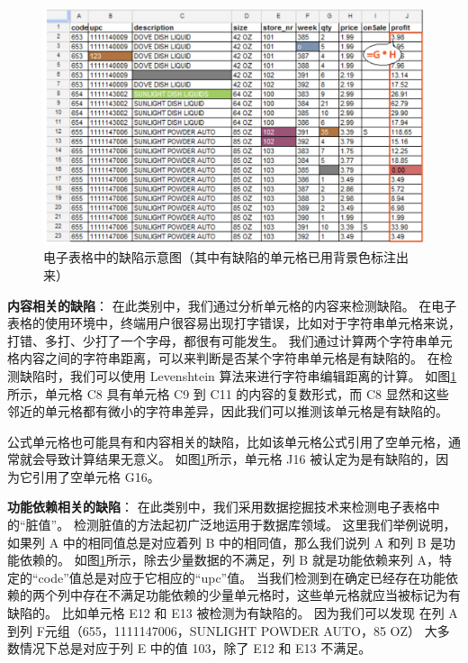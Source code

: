\begin{figure}[tbp]    
    \centering
    \includegraphics[width=\textwidth]{figure/relatedwork/valueSmell.png}
    \caption{电子表格中的缺陷示意图（其中有缺陷的单元格已用背景色标注出来）}
    \label{figure-valuesmell}
\end{figure}

\textbf{内容相关的缺陷}：
在此类别中，我们通过分析单元格的内容来检测缺陷。
在电子表格的使用环境中，终端用户很容易出现打字错误，比如对于字符串单元格来说，打错、多打、少打了一个字母，都很有可能发生。
我们通过计算两个字符串单元格内容之间的字符串距离，可以来判断是否某个字符串单元格是有缺陷的。
在检测缺陷时，我们可以使用 Levenshtein 算法来进行字符串编辑距离的计算。
如图\ref{figure-valuesmell}所示，单元格 C8 具有单元格 C9 到 C11 的内容的复数形式，而 C8 显然和这些邻近的单元格都有微小的字符串差异，因此我们可以推测该单元格是有缺陷的。

公式单元格也可能具有和内容相关的缺陷，比如该单元格公式引用了空单元格，通常就会导致计算结果无意义。
如图\ref{figure-valuesmell}所示，单元格 J16 被认定为是有缺陷的，因为它引用了空单元格 G16。

\textbf{功能依赖相关的缺陷}：
在此类别中，我们采用数据挖掘技术来检测电子表格中的“脏值”。
检测脏值的方法起初广泛地运用于数据库领域。
这里我们举例说明，如果列 A 中的相同值总是对应着列 B 中的相同值，那么我们说列 A 和列 B 是功能依赖的。
如图\ref{figure-valuesmell}所示，除去少量数据的不满足，列 B 就是功能依赖来列 A，特定的“code”值总是对应于它相应的“upc”值。
当我们检测到在确定已经存在功能依赖的两个列中存在不满足功能依赖的少量单元格时，这些单元格就应当被标记为有缺陷的。
比如单元格 E12 和 E13 被检测为有缺陷的。
因为我们可以发现 在列 A 到列 F元组（655，1111147006，SUNLIGHT POWDER AUTO，85 OZ） 大多数情况下总是对应于列 E 中的值 103，除了 E12 和 E13 不满足。

